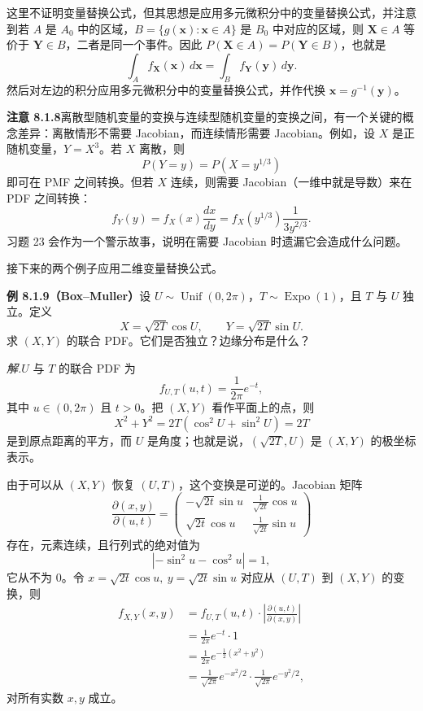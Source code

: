 \documentclass[UTF8,12pt,a4paper,fontset=fandol]{ctexart}
\begin{document}
这里不证明变量替换公式，但其思想是应用多元微积分中的变量替换公式，并注意到若 $A$ 是 $A_0$ 中的区域，$B=\{g(\mathbf x):\mathbf x\in A\}$ 是 $B_0$ 中对应的区域，则 $\mathbf X\in A$ 等价于 $\mathbf Y\in B$，二者是同一个事件。因此 $P(\mathbf X\in A)=P(\mathbf Y\in B)$，也就是
\[
  \int_A f_{\mathbf X}(\mathbf x)\,d\mathbf x
  =
  \int_B f_{\mathbf Y}(\mathbf y)\,d\mathbf y.
\]
然后对左边的积分应用多元微积分中的变量替换公式，并作代换 $\mathbf x=g^{-1}(\mathbf y)$。

\noindent\textbf{注意 8.1.8}\quad 离散型随机变量的变换与连续型随机变量的变换之间，有一个关键的概念差异：离散情形不需要 Jacobian，而连续情形需要 Jacobian。例如，设 $X$ 是正随机变量，$Y=X^3$。若 $X$ 离散，则
\[
  P(Y=y)=P(X=y^{1/3})
\]
即可在 PMF 之间转换。但若 $X$ 连续，则需要 Jacobian（一维中就是导数）来在 PDF 之间转换：
\[
  f_Y(y)=f_X(x)\frac{dx}{dy}
  =f_X(y^{1/3})\frac{1}{3y^{2/3}}.
\]
习题 23 会作为一个警示故事，说明在需要 Jacobian 时遗漏它会造成什么问题。

接下来的两个例子应用二维变量替换公式。

\noindent\textbf{例 8.1.9（Box--Muller）}\quad 设 $U\sim\operatorname{Unif}(0,2\pi)$，$T\sim\operatorname{Expo}(1)$，且 $T$ 与 $U$ 独立。定义
\[
  X=\sqrt{2T}\cos U,\qquad Y=\sqrt{2T}\sin U.
\]
求 $(X,Y)$ 的联合 PDF。它们是否独立？边缘分布是什么？

\noindent\textit{解.}\quad $U$ 与 $T$ 的联合 PDF 为
\[
  f_{U,T}(u,t)=\frac{1}{2\pi}e^{-t},
\]
其中 $u\in(0,2\pi)$ 且 $t>0$。把 $(X,Y)$ 看作平面上的点，则
\[
  X^2+Y^2=2T(\cos^2U+\sin^2U)=2T
\]
是到原点距离的平方，而 $U$ 是角度；也就是说，$(\sqrt{2T},U)$ 是 $(X,Y)$ 的极坐标表示。

由于可以从 $(X,Y)$ 恢复 $(U,T)$，这个变换是可逆的。Jacobian 矩阵
\[
  \frac{\partial(x,y)}{\partial(u,t)}
  =
  \begin{pmatrix}
    -\sqrt{2t}\sin u & \frac{1}{\sqrt{2t}}\cos u\\
    \sqrt{2t}\cos u & \frac{1}{\sqrt{2t}}\sin u
  \end{pmatrix}
\]
存在，元素连续，且行列式的绝对值为
\[
  |-\sin^2u-\cos^2u|=1,
\]
它从不为 $0$。令 $x=\sqrt{2t}\cos u,\ y=\sqrt{2t}\sin u$ 对应从 $(U,T)$ 到 $(X,Y)$ 的变换，则
\[
\begin{aligned}
  f_{X,Y}(x,y)
  &=f_{U,T}(u,t)\cdot\left|\frac{\partial(u,t)}{\partial(x,y)}\right|\\
  &=\frac{1}{2\pi}e^{-t}\cdot 1\\
  &=\frac{1}{2\pi}e^{-\frac12(x^2+y^2)}\\
  &=\frac{1}{\sqrt{2\pi}}e^{-x^2/2}\cdot
    \frac{1}{\sqrt{2\pi}}e^{-y^2/2},
\end{aligned}
\]
对所有实数 $x,y$ 成立。
\end{document}
